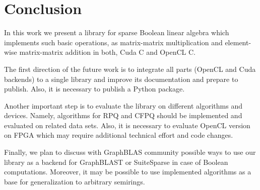 \section{Conclusion}

In this work we present a library for sparse Boolean linear algebra which implements such basic operations, as matrix-matrix multiplication and element-wise matrix-matrix addition in both, Cuda C and OpenCL C.

The first direction of the future work is to integrate all parts (OpenCL and Cuda backends) to a single library and improve its documentation and prepare to publish. 
Also, it is necessary to publish a Python package.

Another important step is to evaluate the library on different algorithms and devices.
Namely, algorithms for RPQ and CFPQ should be implemented and evaluated on related data sets.
Also, it is necessary to evaluate OpenCL version on FPGA which may require additional technical effort and code changes.

Finally, we plan to discuss with GraphBLAS community possible ways to use our library as a backend for GraphBLAST or SuiteSparse in case of Boolean computations.
Moreover, it may be possible to use implemented algorithms as a base for generalization to arbitrary semirings.
